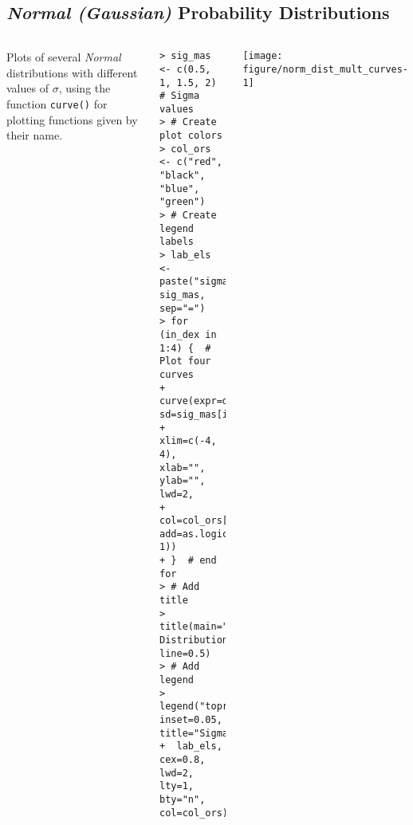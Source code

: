 \documentclass[10pt]{beamer}\usepackage[]{graphicx}\usepackage[]{color}
\makeatletter
\newenvironment{kframe}{%
 \def\at@end@of@kframe{}%
 \ifinner\ifhmode%
  \def\at@end@of@kframe{\end{minipage}}%
  \begin{minipage}{\columnwidth}%
 \fi\fi%
 \def\FrameCommand##1{\hskip\@totalleftmargin \hskip-\fboxsep
 \colorbox{shadecolor}{##1}\hskip-\fboxsep
     \hskip-\linewidth \hskip-\@totalleftmargin \hskip\columnwidth}%
 \MakeFramed {\advance\hsize-\width
   \@totalleftmargin\z@ \linewidth\hsize
   \@setminipage}}%
 {\par\unskip\endMakeFramed%
 \at@end@of@kframe}
\newenvironment{knitrout}{}{} %
\makeatother
\begin{document}
\subsection{\protect\emph{Normal (Gaussian)} Probability Distributions}
\begin{frame}[fragile,t]{\subsecname}
\vspace{-1em}
\begin{block}{}
  \begin{columns}[T]
      Plots of several \emph{Normal} distributions with different values of $\sigma$, using the function \texttt{curve()} for plotting functions given by their name.
\begin{knitrout}\tiny
{}\color{fgcolor}\begin{kframe}
\begin{verbatim}
> sig_mas <- c(0.5, 1, 1.5, 2)  # Sigma values
> # Create plot colors
> col_ors <- c("red", "black", "blue", "green")
> # Create legend labels
> lab_els <- paste("sigma", sig_mas, sep="=")
> for (in_dex in 1:4) {  # Plot four curves
+   curve(expr=dnorm(x, sd=sig_mas[in_dex]),
+   xlim=c(-4, 4), xlab="", ylab="", lwd=2,
+   col=col_ors[in_dex], add=as.logical(in_dex-1))
+ }  # end for
> # Add title
> title(main="Normal Distributions", line=0.5)
> # Add legend
> legend("topright", inset=0.05, title="Sigmas",
+  lab_els, cex=0.8, lwd=2, lty=1, bty="n", col=col_ors)
\end{verbatim}
\end{kframe}
\end{knitrout}
      \texttt{[image: figure/norm\_dist\_mult\_curves-1]}
  \end{columns}
\end{block}

\end{frame}


\end{document}

